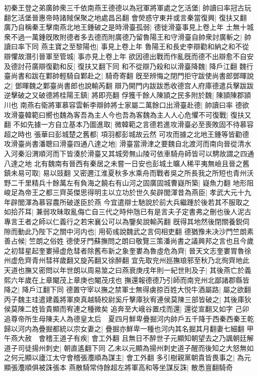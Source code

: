 初秦王登之弟廣帥衆三千依南燕王德德以為冠軍將軍處之乞活堡|{
	帥讀曰率冠古玩翻乞活堡晉惠帝時諸賊保聚之地處昌呂翻}
會熒惑守東井或言秦當復興|{
	復扶又翻}
廣乃自稱秦王擊南燕北地王鍾破之是時滑臺孤弱|{
	德徙滑臺事見上卷上年}
土無十城衆不過一萬鍾旣敗附德者多去德而附廣德乃留魯陽王和守滑臺自帥衆討廣斬之|{
	帥讀曰率下同}
燕主寶之至黎陽也|{
	事見上卷上年}
魯陽王和長史李辯勸和納之和不從辯懼故潛引晉軍至管城|{
	事亦見上卷上年}
欲因德出戰而作亂旣而德不出辯愈不自安及德討苻廣辯復勸和反|{
	復扶又翻下同}
和不從辯乃殺和以滑臺降魏|{
	降戶江翻}
魏行臺尚書和跋在鄴帥輕騎自鄴赴之|{
	騎奇寄翻}
旣至辨悔之閉門拒守跋使尚書郎鄧暉說之|{
	鄧暉魏之鄴臺尚書郎也說輸芮翻}
辯乃開門内跋跋悉收德宫人府庫德遣兵擊跋跋逆擊破之又破德將桂陽王鎮|{
	將即亮翻}
俘獲千餘人陳頴之民多附於魏|{
	陳頴陳郡頴川也}
南燕右衛將軍慕容雲斬李辯帥將士家屬二萬餘口出滑臺赴德|{
	帥讀曰率}
德欲攻滑臺韓範曰嚮也魏為客吾為主人今也吾為客魏為主人人心危懼不可復戰|{
	復扶又翻}
不如先據一方自立基本乃圖進取|{
	微韓範之言德若進攻滑臺必至喪敗固不待慕容超之時也}
張華曰彭城楚之舊都|{
	項羽都彭城故云然}
可攻而據之北地王鍾等皆勸德攻滑臺尚書潘聰曰滑臺四通八達之地|{
	滑臺當滑津之要魏自北渡河而南向晉從清水入河秦沿渭順河而下皆湊於滑臺又其城旁無山陵可依車騎舟師皆可以騁故謂之四通八達之地}
北有魏南有晉西有秦居之未嘗一日安也彭城土曠人稀平夷無嶮且晉之舊鎮未易可取|{
	易以豉翻}
又密邇江淮夏秋多水乘舟而戰者吳之所長我之所短也青州沃野二千里精兵十餘萬左有負海之饒右有山河之固廣固城曹嶷所築|{
	嶷魚力翻}
地形阻峻足為帝王之都三齊英傑思得明主以立功於世久矣辟閭渾昔為燕臣|{
	孝武大元十九年辟閭渾為慕容農所破遂臣於燕}
今宜遣辯士馳說於前大兵繼踵於後若其不服取之如拾芥耳|{
	兼弱攻昧取亂侮亡自三代之時仲虺已有是言夫子定書弗之刪也後人泥古專言王者之師以仁義行之若宋襄公可以為鑒矣說輸芮翻}
旣得其地然後閉關養鋭伺隙而動此乃陛下之關中河内也|{
	用荀彧說魏武之言伺相吏翻}
德猶豫未决沙門竺朗素善占候|{
	竺朗之俗姓}
德使牙門蘇撫問之朗曰敬覽三策潘尚書之議興邦之言也且今歲之初彗星起奎婁掃虚危彗者除舊布新之象奎婁為魯虛危為齊|{
	晉天文志奎婁胃魯徐州虚危齊青州彗祥歲翻又旋芮翻又徐醉翻}
宜先取兖州廵撫琅邪至秋乃北徇齊地此天道也撫又密問以年世朗以周易筮之曰燕衰庚戌年則一紀世則及子|{
	其後燕亡於義熙六年歲在上章閹茂上章庚也閹茂戌也}
撫還報德德乃引師而南兖州北鄙諸郡縣皆降之|{
	降戶江翻下同}
德置守宰以撫之禁軍士無得虜掠百姓大悦牛酒屬路|{
	屬之欲翻}
丙子魏主珪遣建義將軍庾真越騎校尉奚斤擊庫狄宥連侯莫陳三部皆破之|{
	其後庫狄侯莫陳二姓皆貴顯而宥連之種微矣}
追奔至大峨谷置戍而還|{
	還從宣翻又如字}
己卯追尊帝所生母陳夫人為德皇太后　夏四月鮮卑疊掘河内帥戶五千降于西秦西秦王乾歸以河内為疊掘都統以宗女妻之|{
	疊掘亦鮮卑一種也河内其名掘其月翻妻七細翻}
甲午燕大赦　會稽王道子有疾|{
	會工外翻}
且無日不醉世子元顯知朝望去之乃諷朝廷解道子司徒揚州刺史|{
	朝直遙翻下同}
乙未以元顯為揚州刺史道子醒而後知之大怒無如之何元顯以廬江太守會稽張灋順為謀主|{
	會工外翻}
多引樹親黨朝貴皆畏事之|{
	為元顯張灋順俱被誅張本}
燕散騎常侍餘超左將軍高和等坐謀反誅|{
	散悉亶翻騎奇}


